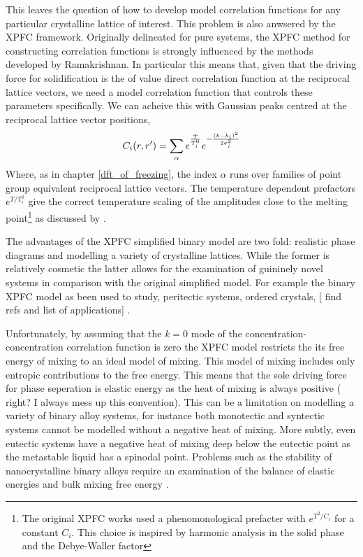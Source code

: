 This leaves the question of how to develop model correlation functions for any
particular crystalline lattice of interest. This problem is also anwsered by
the XPFC framework. Originally delineated for pure systems, the XPFC method for
constructing correlation functions is strongly influenced by the methods
developed by Ramakrishnan. In particular this means that, given that the
driving force for solidification is the of value direct correlation function at
the reciprocal lattice vectors, we need a model correlation function that
controls these parameters specifically. We can acheive this with Gaussian peaks
centred at the reciprocal lattice vector positions,
%
\begin{equation}
    C_i(r, r^\prime) = \sum_{\alpha} e^{\frac{T}{T_i^0}}
        e^{ - \frac{(k - k_i)^2}{2\sigma_i^2}}
\end{equation}
%
Where, as in chapter \ref{dft_of_freezing}, the index $\alpha$ runs over
families of point group equivalent reciprocal lattice vectors. The temperature
dependent prefactors $e^{T / T_i^0}$ give the correct temperature scaling of
the amplitudes close to the melting point\footnote{The original XPFC works used
a phenomonological prefacter with $e^{T^2 / C_i}$ for a constant $C_i$. This
choice is inspired by harmonic analysis in the solid phase and the Debye-Waller
factor} as discussed by \cite{ALSTER17}.

The advantages of the XPFC simplified binary model are two fold: realistic 
phase diagrams and modelling a variety of crystalline lattices. While the
former is relatively cosmetic the latter allows for the examination of 
guininely novel systems in comparison with the original simplified model. For
example the binary XPFC model as been used to study, peritectic systems, 
ordered crystals, [{\color{ForestGreen} find refs and list of applications}]
\cite{GREENWOOD11, ALSTER17}. 

Unfortunately, by assuming that the $k=0$ mode of the concentration-concentration
correlation function is zero the XPFC model restricts the its free energy of
mixing to an ideal model of mixing. This model of mixing includes only entropic
contributions to the free energy. This means that the sole driving force for 
phase seperation is elastic energy as the heat of mixing is always positive (
{\color{ForestGreen} right? I always mess up this convention}). This can be a
limitation on modelling a variety of binary alloy systems, for instance both
monotectic and syntectic systems cannot be modelled without a negative heat
of mixing. More subtly, even eutectic systems have a negative heat of mixing deep
below the eutectic point as the metastable liquid has a spinodal point. Problems 
such as the stability of nanocrystalline binary alloys require an examination of
the balance of elastic energies and bulk mixing free energy \cite{murdoch}.

